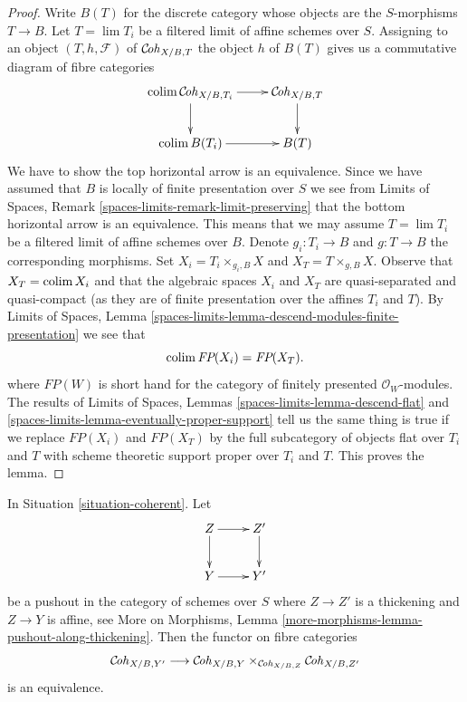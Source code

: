 \begin{proof}
Write $B(T)$ for the discrete category whose
objects are the $S$-morphisms $T \to B$. Let $T = \lim T_i$ be a filtered
limit of affine schemes over $S$. Assigning to an object
$(T, h, \mathcal{F})$ of $\mathcal{C}\!\mathit{oh}_{X/B, T}$ the object $h$
of $B(T)$ gives us a commutative diagram of fibre categories
$$
\xymatrix{
\colim \Cohstack_{X/B, T_i} \ar[r] \ar[d] &
\Cohstack_{X/B, T} \ar[d] \\
\colim B(T_i) \ar[r] & B(T)
}
$$
We have to show the top horizontal arrow is an equivalence. Since
we have assumed that $B$ is locally of finite presentation over $S$
we see from
Limits of Spaces, Remark \ref{spaces-limits-remark-limit-preserving}
that the bottom horizontal arrow is an equivalence. This means that
we may assume $T = \lim T_i$ be a filtered limit of affine schemes over
$B$. Denote $g_i : T_i \to B$ and $g : T \to B$ the corresponding
morphisms. Set $X_i = T_i \times_{g_i, B} X$ and $X_T = T \times_{g, B} X$.
Observe that $X_T = \mathop{\mathrm{colim}}\nolimits X_i$ and that the algebraic spaces
$X_i$ and $X_T$ are quasi-separated and quasi-compact (as they
are of finite presentation over the affines $T_i$ and $T$).
By Limits of Spaces, Lemma
\ref{spaces-limits-lemma-descend-modules-finite-presentation}
we see that
$$
\mathop{\mathrm{colim}}\nolimits \textit{FP}(X_i) = \textit{FP}(X_T).
$$
where $\textit{FP}(W)$ is short hand for the category of finitely
presented $\mathcal{O}_W$-modules. The results of
Limits of Spaces, Lemmas \ref{spaces-limits-lemma-descend-flat} and
\ref{spaces-limits-lemma-eventually-proper-support}
tell us the same thing is true if we replace $\textit{FP}(X_i)$
and $\textit{FP}(X_T)$ by the full subcategory of objects
flat over $T_i$ and $T$ with scheme theoretic support proper
over $T_i$ and $T$. This proves the lemma.
\end{proof}

\begin{lemma}
\label{lemma-coherent-RS-star}
In Situation \ref{situation-coherent}. Let
$$
\xymatrix{
Z \ar[r] \ar[d] & Z' \ar[d] \\
Y \ar[r] & Y'
}
$$
be a pushout in the category of schemes over $S$ where
$Z \to Z'$ is a thickening and $Z \to Y$ is affine, see
More on Morphisms, Lemma \ref{more-morphisms-lemma-pushout-along-thickening}.
Then the functor on fibre categories
$$
\mathcal{C}\!\mathit{oh}_{X/B, Y'}
\longrightarrow
\mathcal{C}\!\mathit{oh}_{X/B, Y} \times_{\mathcal{C}\!\mathit{oh}_{X/B, Z}} \mathcal{C}\!\mathit{oh}_{X/B, Z'}
$$
is an equivalence.
\end{lemma}

